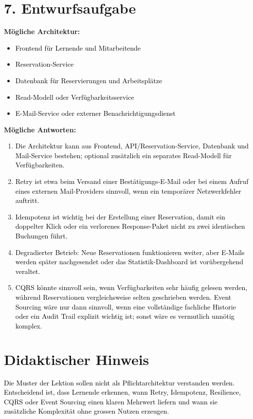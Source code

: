 \documentclass[11pt,a4paper]{article}
\newcommand{\solution}[1]{\textcolor{black}{#1}}
\begin{document}
\section*{7. Entwurfsaufgabe}
\textbf{Mögliche Architektur:}
\begin{itemize}
  \item \solution{Frontend für Lernende und Mitarbeitende}
  \item \solution{Reservation-Service}
  \item \solution{Datenbank für Reservierungen und Arbeitsplätze}
  \item \solution{Read-Modell oder Verfügbarkeitsservice}
  \item \solution{E-Mail-Service oder externer Benachrichtigungsdienst}
\end{itemize}

\textbf{Mögliche Antworten:}
\begin{enumerate}
  \item \solution{Die Architektur kann aus Frontend, API/Reservation-Service, Datenbank und Mail-Service bestehen; optional zusätzlich ein separates Read-Modell für Verfügbarkeiten.}
  \item \solution{Retry ist etwa beim Versand einer Bestätigungs-E-Mail oder bei einem Aufruf eines externen Mail-Providers sinnvoll, wenn ein temporärer Netzwerkfehler auftritt.}
  \item \solution{Idempotenz ist wichtig bei der Erstellung einer Reservation, damit ein doppelter Klick oder ein verlorenes Response-Paket nicht zu zwei identischen Buchungen führt.}
  \item \solution{Degradierter Betrieb: Neue Reservationen funktionieren weiter, aber E-Mails werden später nachgesendet oder das Statistik-Dashboard ist vorübergehend veraltet.}
  \item \solution{CQRS könnte sinnvoll sein, wenn Verfügbarkeiten sehr häufig gelesen werden, während Reservationen vergleichsweise selten geschrieben werden. Event Sourcing wäre nur dann sinnvoll, wenn eine vollständige fachliche Historie oder ein Audit Trail explizit wichtig ist; sonst wäre es vermutlich unnötig komplex.}
\end{enumerate}

\section*{Didaktischer Hinweis}
\solution{Die Muster der Lektion sollen nicht als Pflichtarchitektur verstanden werden. Entscheidend ist, dass Lernende erkennen, wann Retry, Idempotenz, Resilience, CQRS oder Event Sourcing einen klaren Mehrwert liefern und wann sie zusätzliche Komplexität ohne grossen Nutzen erzeugen.}
\end{document}
